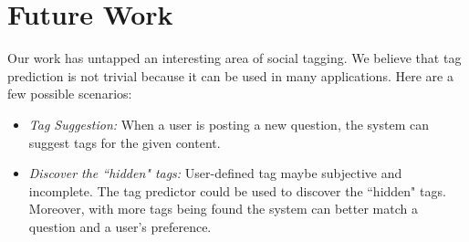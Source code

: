 \section {Future Work}
Our work has untapped an interesting area of social tagging. We believe that tag prediction is not trivial because it can be used in many applications. Here are a few possible scenarios:
\begin{itemize}
    \item \emph{Tag Suggestion:} When a user is posting a new question, the system can suggest tags for the given content.
    \item \emph{Discover the ``hidden" tags:} User-defined tag maybe subjective and incomplete. The tag predictor could be used to discover the ``hidden" tags. Moreover, with more tags being found the system can better match a question and a user's preference.
\end{itemize}

